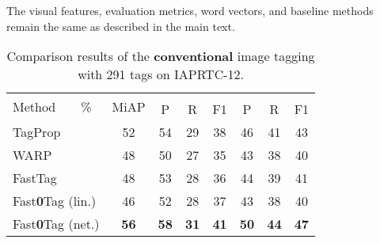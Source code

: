 \documentclass[10pt,twocolumn,letterpaper]{article}
\begin{document}
The visual features, evaluation metrics, word vectors, and baseline methods remain the same as described in the main text.











\begin{table}
\centering
\caption{Comparison results of the \textbf{conventional} image tagging with 291 tags on IAPRTC-12. }
\label{tConventional}
\small
\begin{tabular}{|l|c|c|c|c|c|c|c|}
\hline
\multirow{2}{*}{ Method~~~~\%} & \multirow{2}{*}{ MiAP} & \multicolumn{3}{c|}{} & \multicolumn{3}{|c|}{}\\
    & \multirow{1}{*}{} & P & R  & { F1} & P & R & { F1} \\
    
\hline\hline
{TagProp}~\cite{guillaumin_tagprop:_2009} & 52 &  54 & 29 & 38 & 46 & 41 & 43\\
\hline
{WARP}~\cite{gong_deep_2013} & 48 &  50 & 27 & 35 &  43 & 38 & 40\\
\hline
{FastTag}~\cite{chen_fast_2013} & 48 & 53 & 28 & 36 & 44 & 39 & 41\\
\hline
{Fast\textbf{0}Tag (lin.)}& 46 & 52 & 28 & 37 & 43 & 38 & 40\\
\hline
{Fast\textbf{0}Tag (net.)} & {\bf 56} &  {\bf 58} & {\bf 31} & {\bf 41} & {\bf 50} & {\bf 44} & {\bf 47}\\
\hline
\end{tabular}
\vspace{-4pt}
\end{table}
\end{document}
